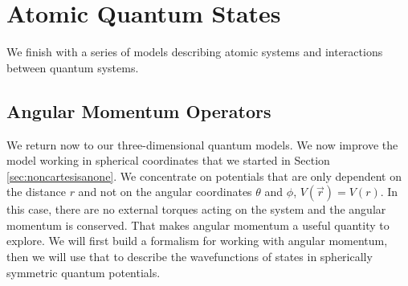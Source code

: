 




\part{Atomic Quantum States \label{part4}}

We finish with a series of models describing atomic systems and interactions between quantum systems.

\begin{figure}
\centering
{}
\end{figure}


\chapter{Angular Momentum Operators}

We return now to our three-dimensional quantum models. We now improve the model working in spherical coordinates that we started in Section \ref{sec:noncartesisanone}. We concentrate on potentials that are only dependent on the distance $r$ and not on the angular coordinates $\theta$ and $\phi$, $V(\vec{r}) = V(r)$. In this case, there are no external torques acting on the system and the angular momentum is conserved. That makes angular momentum a useful quantity to explore. We will first build a formalism for working with angular momentum, then we will use that to describe the wavefunctions of states in spherically symmetric quantum potentials.

